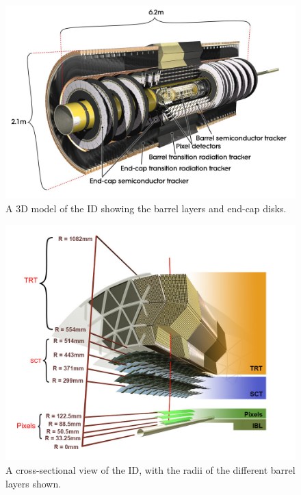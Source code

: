 \begin{figure}[!htpb]
  \centering
  \includegraphics[width=0.75\linewidth]{chapters/2.detector/figs/atlas_id.jpg}
  \caption{A 3D model of the \ATLAS ID showing the barrel layers and end-cap disks.}
  \label{fig:atlas_id_run1}
\end{figure}
%
\begin{figure}[!htpb]
  \centering
  \includegraphics[width=0.75\linewidth]{chapters/2.detector/figs/atlas_id_xs.png}
  \caption{A cross-sectional view of the \ATLAS ID, with the radii of the different barrel layers shown.}
  \label{fig:atlas_id_run2}
\end{figure}
%

